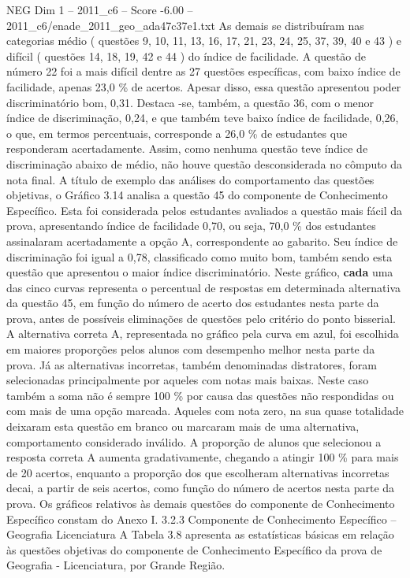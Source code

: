 \begin{textsample}{NEG Dim 1 – 2011\_c6 – Score -6.00 – 2011\_c6/enade\_2011\_geo\_ada47c37e1.txt}
As demais se distribuíram nas categorias médio ( questões 9, 10, 11, 13, 16, 17, 21, 23, 24, 25, 37, 39, 40 e 43 ) e difícil ( questões 14, 18, 19, 42 e 44 ) do índice de facilidade.
A questão de número 22 foi a mais difícil dentre as 27 questões específicas, com baixo índice de facilidade, apenas 23,0 \% de acertos.
Apesar disso, essa questão apresentou poder discriminatório bom, 0,31.
Destaca -se, também, a questão 36, com o menor índice de discriminação, 0,24, e que também teve baixo índice de facilidade, 0,26, o que, em termos percentuais, corresponde a 26,0 \% de estudantes que responderam acertadamente.
Assim, como nenhuma questão teve índice de discriminação abaixo de médio, não houve questão desconsiderada no cômputo da nota final.
A título de exemplo das análises do comportamento das questões objetivas, o Gráfico 3.14 analisa a questão 45 do componente de Conhecimento Específico.
Esta foi considerada pelos estudantes avaliados a questão mais fácil da prova, apresentando índice de facilidade 0,70, ou seja, 70,0 \% dos estudantes assinalaram acertadamente a opção A, correspondente ao gabarito.
Seu índice de discriminação foi igual a 0,78, classificado como muito bom, também sendo esta questão que apresentou o maior índice discriminatório.
Neste gráfico, \textbf{cada} uma das cinco curvas representa o percentual de respostas em determinada alternativa da questão 45, em função do número de acerto dos estudantes nesta parte da prova, antes de possíveis eliminações de questões pelo critério do ponto bisserial.
A alternativa correta A, representada no gráfico pela curva em azul, foi escolhida em maiores proporções pelos alunos com desempenho melhor nesta parte da prova.
Já as alternativas incorretas, também denominadas distratores, foram selecionadas principalmente por aqueles com notas mais baixas.
Neste caso também a soma não é sempre 100 \% por causa das questões não respondidas ou com mais de uma opção marcada.
Aqueles com nota zero, na sua quase totalidade deixaram esta questão em branco ou marcaram mais de uma alternativa, comportamento considerado inválido.
A proporção de alunos que selecionou a resposta correta A aumenta gradativamente, chegando a atingir 100 \% para mais de 20 acertos, enquanto a proporção dos que escolheram alternativas incorretas decai, a partir de seis acertos, como função do número de acertos nesta parte da prova.
Os gráficos relativos às demais questões do componente de Conhecimento Específico constam do Anexo I. 3.2.3 Componente de Conhecimento Específico – Geografia Licenciatura A Tabela 3.8 apresenta as estatísticas básicas em relação às questões objetivas do componente de Conhecimento Específico da prova de Geografia - Licenciatura, por Grande Região.

\end{textsample}
